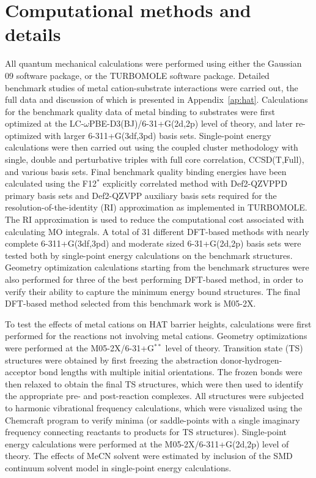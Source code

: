 \section{Computational methods and details}

All quantum mechanical calculations were performed using either the Gaussian 09
software package,\cite{Frisch2009} or the TURBOMOLE software
package.\cite{turbomole} Detailed benchmark studies of metal cation-substrate
interactions were carried out, the full data and discussion of which is
presented in Appendix~\ref{ap:hat}. Calculations for the benchmark quality data
of metal binding to substrates were first optimized at the
LC-$\omega$PBE-D3(BJ)/6-31+G(2d,2p) level of theory,\cite{Vydrov2006,
Vydrov2006a, Grimme2010, Johnson2006} and later re-optimized with larger
6-311+G(3df,3pd) basis sets. Single-point energy calculations were then carried
out using the coupled cluster methodology with single, double and perturbative
triples with full core correlation, CCSD(T,Full), and various basis sets. Final
benchmark quality binding energies have been calculated using the F12$^*$
explicitly correlated method with Def2-QZVPPD primary basis sets and Def2-QZVPP
auxiliary basis sets required for the resolution-of-the-identity (RI)
approximation as implemented in TURBOMOLE. The RI approximation is used to
reduce the computational cost associated with calculating MO
integrals. A total
of 31 different DFT-based methods with nearly complete 6-311+G(3df,3pd) and
moderate sized 6-31+G(2d,2p) basis sets were tested both by single-point energy
calculations on the benchmark structures. Geometry optimization calculations
starting from the benchmark structures were also performed for three of the best
performing DFT-based method, in order to verify their ability to capture the
minimum energy bound structures. The final DFT-based method selected from this
benchmark work is M05-2X.\cite{Zhao2006}

To test the effects of metal cations on HAT barrier heights, calculations were
first performed for the reactions not involving metal cations. Geometry
optimizations were performed at the M05-2X/6-31+G$^{**}$ level of
theory. Transition state (TS) structures were obtained by first freezing the
abstraction donor-hydrogen-acceptor bond lengths with multiple initial
orientations. The frozen bonds were then relaxed to obtain the final TS
structures, which were then used to identify the appropriate pre- and
post-reaction complexes. All structures were subjected to harmonic vibrational
frequency calculations, which were visualized using the Chemcraft
program\cite{ccraft} to verify minima (or saddle-points with a single imaginary
frequency connecting reactants to products for TS structures). Single-point
energy calculations were performed at the M05-2X/6-311+G(2d,2p) level of theory.
The effects of MeCN solvent were estimated by inclusion of the
SMD\cite{Marenich2009} continuum solvent model in single-point energy
calculations.

